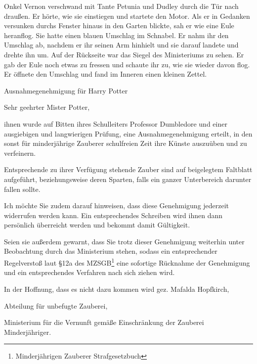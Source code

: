 Onkel Vernon verschwand mit Tante Petunia und Dudley durch die Tür nach draußen. Er hörte, wie sie einstiegen und startete den Motor. Als er in Gedanken versunken durchs Fenster hinaus in den Garten blickte, sah er wie eine Eule heranflog. Sie hatte einen blauen Umschlag im Schnabel. Er nahm ihr den Umschlag ab, nachdem er ihr seinen Arm hinhielt und sie darauf landete und drehte ihn um. Auf der Rückseite war das Siegel des Ministeriums zu sehen. Er gab der Eule noch etwas zu fressen und schaute ihr zu, wie sie wieder davon flog. Er öffnete den Umschlag und fand im Inneren einen kleinen Zettel.

\begin{brief}
Ausnahmegenehmigung für Harry Potter

Sehr geehrter Mister Potter,

ihnen wurde auf Bitten ihres Schulleiters Professor Dumbledore und einer ausgiebigen und langwierigen Prüfung, eine Ausnahmegenehmigung erteilt, in den sonst für minderjährige Zauberer schulfreien Zeit ihre Künste auszuüben und zu verfeinern.

Entsprechende zu ihrer Verfügung stehende Zauber sind auf beigelegtem Faltblatt aufgeführt, beziehungsweise deren Sparten, falls ein ganzer Unterbereich darunter fallen sollte.

Ich möchte Sie zudem darauf hinweisen, dass diese Genehmigung jederzeit widerrufen werden kann. Ein entsprechendes Schreiben wird ihnen dann persönlich überreicht werden und bekommt damit Gültigkeit.

Seien sie außerdem gewarnt, dass Sie trotz dieser Genehmigung weiterhin unter Beobachtung durch das Ministerium stehen, sodass ein entsprechender Regelverstoß laut §12a des MZSGB\footnote{Minderjährigen Zauberer Strafgesetzbuch} eine sofortige Rücknahme der Genehmigung und ein entsprechendes Verfahren nach sich ziehen wird.

In der Hoffnung, dass es nicht dazu kommen wird
\signumspace
gez. Mafalda Hopfkirch,

Abteilung für unbefugte Zauberei,

Ministerium für die Vernunft gemäße Einschränkung der Zauberei Minderjähriger.
\end{brief}


